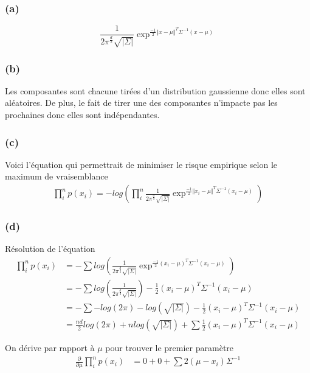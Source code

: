 \documentclass{article}
\begin{document}
	\subsubsection*{(a)}
	\begin{equation}
	\frac{1}{2\pi^{\frac{d}{2}}\sqrt{\vert\Sigma\vert}}\exp^{\frac{-1}{2}\Vert x-\mu\Vert^T{\Sigma^{-1}}(x-\mu)}
	\end{equation}
	\subsubsection*{(b)}
	Les composantes sont chacune tirées d'un distribution gaussienne donc elles sont aléatoires. De plus, le fait de tirer une des composantes n'impacte pas les prochaines donc elles sont indépendantes.
	\subsubsection*{(c)}
	Voici l'équation qui permettrait de minimiser le risque empirique selon le maximum de vraisemblance
	\begin{equation}
	\begin{split}
		\prod_{i}^{n} p(x_{i}) = -log(\prod_{i}^{n}\frac{1}{2\pi^{\frac{d}{2}}\sqrt{\vert\Sigma\vert}}\exp^{\frac{-1}{2}\Vert x_{i}-\mu\Vert^T{\Sigma^{-1}}(x_{i}-\mu)})
	\end{split}
	\end{equation}
	\subsubsection*{(d)}
	Résolution de l'équation
		\begin{equation}
		\begin{split}
		\prod_{i}^{n} p(x_{i}) &=
		- \sum log(\frac{1}{2\pi^{\frac{d}{2}}\sqrt{\vert\Sigma\vert}}\exp^{\frac{-1}{2} (x_{i}-\mu)^T{\Sigma^{-1}}(x_{i}-\mu)}) \\		
		 &= -\sum log(\frac{1}{2\pi^{\frac{d}{2}}\sqrt{\vert\Sigma\vert}}) - \frac{1}{2}( x_{i}-\mu)^T{\Sigma^{-1}}(x_{i}-\mu) \\
		 &= -\sum -log(2\pi) - log(\sqrt{\vert\Sigma\vert}) - \frac{1}{2}( x_{i}-\mu)^T{\Sigma^{-1}}(x_{i}-\mu)\\
		 &=\frac{nd}{2} log(2\pi) + n log(\sqrt{\vert\Sigma\vert}) + \sum \frac{1}{2}( x_{i}-\mu)^T{\Sigma^{-1}}(x_{i}-\mu)		 
		\end{split}
		\end{equation}
	
	On dérive par rapport à $\mu$ pour trouver le premier paramètre
		\begin{equation}
		\begin{split}
		\frac{\partial}{\partial \mu}\prod_{i}^{n} p(x_{i}) &= 0 + 0 + \sum 2(\mu - x_{i}) \Sigma^{-1}	 
		\end{split}
		\end{equation}	
		
\end{document}
